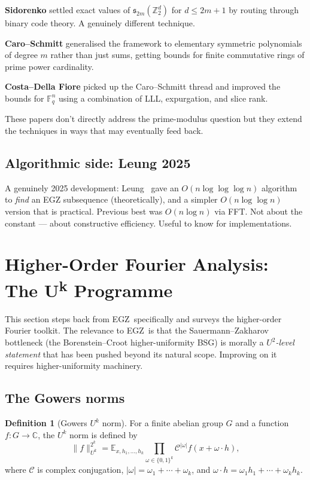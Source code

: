 \documentclass[11pt,a4paper]{article}
\theoremstyle{plain}
\theoremstyle{definition}
\newtheorem{definition}[theorem]{Definition}
\theoremstyle{remark}
\newcommand{\F}{\mathbb{F}}
\newcommand{\Z}{\mathbb{Z}}
\newcommand{\C}{\mathbb{C}}
\newcommand{\E}{\mathbb{E}}
\newcommand{\sUFp}{\mathfrak{s}}
\newcommand{\EGZ}{\textsf{EGZ}}
\begin{document}
\textbf{Sidorenko} settled exact values of $\sUFp_{2m}(\Z_2^d)$ for $d \leq 2m + 1$ by routing through binary code theory. A genuinely different technique.

\textbf{Caro--Schmitt} generalised the framework to elementary symmetric polynomials of degree $m$ rather than just sums, getting bounds for finite commutative rings of prime power cardinality.

\textbf{Costa--Della Fiore} picked up the Caro--Schmitt thread and improved the bounds for $\F_q^n$ using a combination of LLL, expurgation, and slice rank.

These papers don't directly address the prime-modulus question but they extend the techniques in ways that may eventually feed back.

\subsection{Algorithmic side: Leung 2025}

A genuinely 2025 development: Leung~\cite{leung2025} gave an $O(n \log \log \log n)$ algorithm to \emph{find} an EGZ subsequence (theoretically), and a simpler $O(n \log \log n)$ version that is practical. Previous best was $O(n \log n)$ via FFT. Not about the constant --- about constructive efficiency. Useful to know for implementations.

\section{Higher-Order Fourier Analysis: The U\textsuperscript{k} Programme}

This section steps back from \EGZ\ specifically and surveys the higher-order Fourier toolkit. The relevance to \EGZ\ is that the Sauermann--Zakharov bottleneck (the Borenstein--Croot higher-uniformity BSG) is morally a \emph{$U^2$-level statement} that has been pushed beyond its natural scope. Improving on it requires higher-uniformity machinery.

\subsection{The Gowers norms}

\begin{definition}[Gowers $U^k$ norm]
For a finite abelian group $G$ and a function $f: G \to \C$, the $U^k$ norm is defined by
\[
\|f\|_{U^k}^{2^k} = \E_{x, h_1, \ldots, h_k} \prod_{\omega \in \{0,1\}^k} \mathcal{C}^{|\omega|} f(x + \omega \cdot h),
\]
where $\mathcal{C}$ is complex conjugation, $|\omega| = \omega_1 + \cdots + \omega_k$, and $\omega \cdot h = \omega_1 h_1 + \cdots + \omega_k h_k$.
\end{definition}
\end{document}
